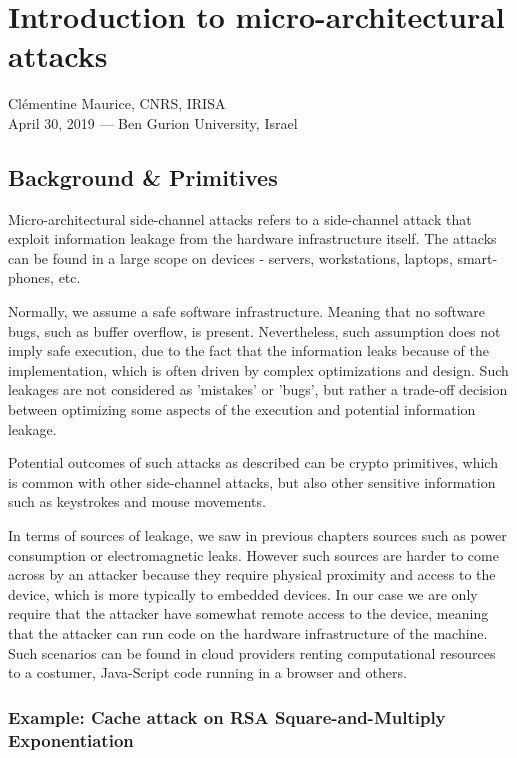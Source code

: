 \chapter{Introduction to micro-architectural attacks}



Clémentine Maurice, CNRS, IRISA\\
April 30, 2019 — Ben Gurion University, Israel

\label{c7_cacheattacks}

\section{Background \& Primitives}\label{arbel:sec}

Micro-architectural side-channel attacks refers to a side-channel attack that exploit information leakage from the hardware infrastructure itself. The attacks can be found in a large scope on devices - servers, workstations, laptops, smart-phones, etc.

Normally, we assume a safe software infrastructure. Meaning that no software bugs, such as buffer overflow, is present. Nevertheless, such assumption does not imply safe execution, due to the fact that the information leaks because of the implementation, which is often driven by complex optimizations and design. Such leakages are not considered as 'mistakes' or 'bugs', but rather a trade-off decision between optimizing some aspects of the execution and potential information leakage.    

Potential outcomes of such attacks as described can be crypto primitives, which is common with other side-channel attacks, but also other sensitive information such as keystrokes and mouse movements.  

In terms of sources of leakage, we saw in previous chapters sources such as power consumption or electromagnetic leaks. However such sources are harder to come across by an attacker because they require physical proximity and access to the device, which is more typically to embedded devices. In our case we are only require that the attacker have somewhat remote access to the device, meaning that the attacker can run code on the hardware infrastructure of the machine. Such scenarios can be found in cloud providers renting computational resources to a costumer, Java-Script code running in a browser and others.

\subsection{Example: Cache attack on RSA Square-and-Multiply Exponentiation}

